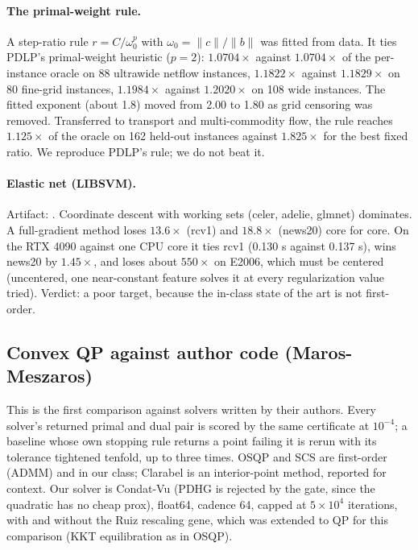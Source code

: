\paragraph{The primal-weight rule.}
 A step-ratio rule
$r = C/\omega_0^p$ with $\omega_0 = \|c\|/\|b\|$ was fitted from data. It ties
PDLP's primal-weight heuristic ($p=2$): $1.0704\times$ against $1.0704\times$
of the per-instance oracle on 88 ultrawide netflow instances, $1.1822\times$
against $1.1829\times$ on 80 fine-grid instances, $1.1984\times$ against
$1.2020\times$ on 108 wide instances. The fitted exponent (about 1.8) moved
from 2.00 to 1.80 as grid censoring was removed. Transferred to transport and
multi-commodity flow, the rule reaches $1.125\times$ of the oracle on 162
held-out instances against $1.825\times$ for the best fixed ratio. We
reproduce PDLP's rule; we do not beat it.

\paragraph{Elastic net (LIBSVM).}
Artifact: .
Coordinate descent with working sets (celer, adelie, glmnet) dominates. A
full-gradient method loses $13.6\times$ (rcv1) and $18.8\times$ (news20) core
for core. On the RTX 4090 against one CPU core it ties rcv1 (0.130 s against
0.137 s), wins news20 by $1.45\times$, and loses about $550\times$ on E2006,
which must be centered (uncentered, one near-constant feature solves it at
every regularization value tried). Verdict: a poor target, because the
in-class state of the art is not first-order.

\subsection{Convex QP against author code (Maros-Meszaros)}
\label{app:log:qp}

 This is the first comparison
against solvers written by their authors. Every solver's returned primal and
dual pair is scored by the same certificate at $10^{-4}$; a baseline whose
own stopping rule returns a point failing it is rerun with its tolerance
tightened tenfold, up to three times. OSQP and SCS are first-order (ADMM) and
in our class; Clarabel is an interior-point method, reported for context.
Our solver is Condat-Vu (PDHG is rejected by the gate, since the quadratic
has no cheap prox), float64, cadence 64, capped at $5\times10^4$ iterations,
with and without the Ruiz rescaling gene, which was extended to QP for this
comparison (KKT equilibration as in OSQP).

